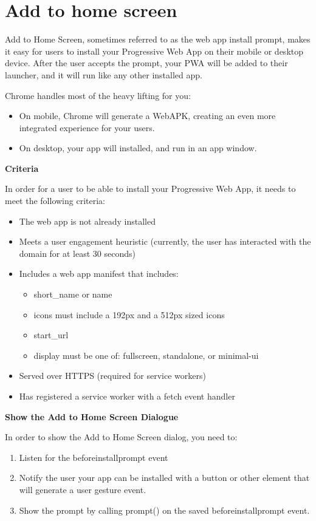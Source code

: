 \documentclass[14pt,a4paper,final]{extreport}
\begin{document}
\newpage
\section{Add to home screen}
\item Add to Home Screen, sometimes referred to as the web app install prompt, makes it easy for users to install your Progressive Web App on their mobile or desktop device. After the user accepts the prompt, your PWA will be added to their launcher, and it will run like any other installed app.

\item Chrome handles most of the heavy lifting for you:
\begin{itemize}
    \item On mobile, Chrome will generate a WebAPK, creating an even more integrated experience for your users.
    \item On desktop, your app will installed, and run in an app window.
\end{itemize}
\newline
\item \textbf{Criteria}
\item In order for a user to be able to install your Progressive Web App, it needs to meet the following criteria:
\begin{itemize}
    \item The web app is not already installed
    \item Meets a user engagement heuristic (currently, the user has interacted with the domain for at least 30 seconds)
    \item Includes a web app manifest that includes:
    \begin{itemize}
        \item short\_name or name
        \item icons must include a 192px and a 512px sized icons
        \item start\_url
        \item display must be one of: fullscreen, standalone, or minimal-ui
    \end{itemize}
    \item Served over HTTPS (required for service workers)
    \item Has registered a service worker with a fetch event handler

\end{itemize}
\item 
\item \textbf{Show the Add to Home Screen Dialogue}
\item In order to show the Add to Home Screen dialog, you need to:
\begin{enumerate}
    \item Listen for the beforeinstallprompt event
    \item Notify the user your app can be installed with a button or other element that will generate a user gesture event.
    \item Show the prompt by calling prompt() on the saved beforeinstallprompt event.
\end{enumerate}
\end{document}
